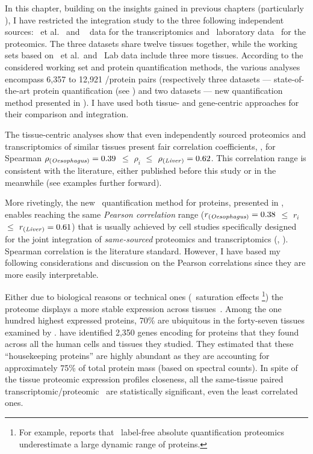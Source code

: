 In this chapter,
building on the insights gained in previous chapters
(particularly ),
I have restricted the integration study to
the three following independent sources:
\uhlen\ et al.~
and \gtex~ data for the transcriptomics
and \pandey\ laboratory data~ for the proteomics.
The three datasets share twelve tissues together,
while the working sets based on \uhlen\ et al.\ and \pandey\ Lab data
include three more tissues.
According to the considered working set and protein quantification methods,
the various analyses encompass 6,357 to 12,921 \mRNA/protein pairs
(respectively
three datasets --- state-of-the-art protein quantification (see )
and two datasets --- new quantification method presented in ).
I have used both tissue- and gene-centric approaches
for their comparison and integration.\mybr\

The tissue-centric analyses show that
even independently sourced proteomics and transcriptomics of similar tissues
present fair correlation coefficients,
\eg, for Spearman $\rho_{\text{(\emph{Oesophagus})}}=0.39$
$≤$ $\rho_i$ $≤$ $\rho_{\text{(\emph{Liver})}}=0.62$.
This correlation range is consistent with the literature,
either published before this study or in the meanwhile (see examples further forward).

More rivetingly,
the new \PPKM\ quantification method for proteins,
presented in ,
enables reaching the same \emph{Pearson correlation} range
($r_{\text{(\emph{Oesophagus})}}=0.38$ $≤$ $r_i$  $≤$ $r_{\text{(\emph{Liver})}}=0.61$)
that is usually achieved by cell studies specifically designed
for the joint integration of \emph{same-sourced} proteomics and transcriptomics
(\eg, \citet{Marguerat2012-sn,schwanhausserglobal:2011,Schwanhausser2013-et,Li2014-ai}).
Spearman correlation is the literature standard.
However, I have based my following considerations and discussion
on the Pearson correlations
since they are more easily interpretable.

Either due to biological reasons or technical ones (\eg\ saturation effects%
\footnote{For example, \citet{TOP3isbetter} reports that
\ms\ label-free absolute quantification proteomics underestimate
a large dynamic range of proteins.})
the proteome displays a more stable expression across
tissues~.
Among the one hundred highest expressed proteins,
70\% are ubiquitous in the forty-seven tissues examined by \citet{KusterData}.
\citet{PandeyData} have identified 2,350 genes encoding for proteins
that they found across all the human cells and tissues they studied.
They estimated that these \enquote{housekeeping proteins} are
highly abundant as they are accounting for approximately 75\% of total protein mass
(based on spectral counts).
In spite of the tissue proteomic expression profiles closeness,
all the same-tissue paired transcriptomic/proteomic \treps\
are statistically significant, even the least correlated ones.

